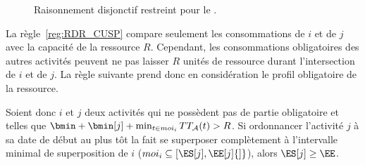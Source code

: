 \begin{ex}
\begin{figure}[htb!]
{
}
  \caption{Raisonnement disjonctif restreint pour le \CECSP.}
  \label{fig:disj_CECSP}
\end{figure}
\end{ex}

La règle~\ref{reg:RDR_CUSP} compare seulement les consommations de $i$
et de $j$ avec la capacité de la ressource $R$. Cependant, les
consommations obligatoires des autres activités peuvent ne pas laisser
$R$ unités de ressource durant l'intersection de $i$ et de $j$. La
règle suivante prend donc en considération le profil obligatoire de la
ressource. 

\begin{reg}
\label{reg:TTDR_CUSP}
Soient donc $i$ et $j$ deux activités qui ne possèdent pas de partie
obligatoire et telles que $ \bmin +\bmin[j] + \min_{t \in moi_i} TT_{\A}(t) >
R$.   Si ordonnancer l'activité
 $j$ à sa date de début au plus tôt la fait se superposer complètement
 à l’intervalle minimal de superposition de $i$ ($moi_i \subseteq
 [\ES[j],\EE[j]{]}$), alors $\ES[j] \ge \EE$.
\end{reg}

